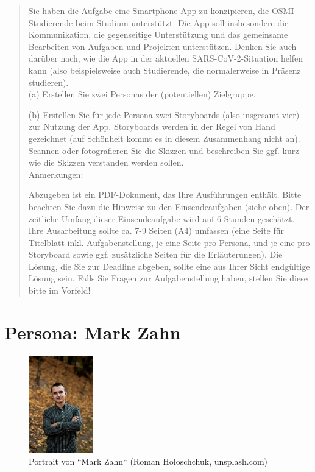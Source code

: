 \documentclass{article}
\begin{document}
\begin{quote}
	Sie haben die Aufgabe eine Smartphone-App zu konzipieren, die OSMI-Studierende beim Studium unterstützt.
	Die App soll insbesondere die Kommunikation, die gegenseitige Unterstützung und das gemeinsame Bearbeiten
	von Aufgaben und Projekten unterstützen. Denken Sie auch darüber nach, wie die App in der aktuellen
	SARS-CoV-2-Situation helfen kann (also beispielsweise auch Studierende, die normalerweise in Präsenz studieren).
	\\[1em]
	(a) Erstellen Sie zwei Personas der (potentiellen) Zielgruppe.

	(b) Erstellen Sie für jede Persona zwei Storyboards (also insgesamt vier) zur Nutzung der App. Storyboards
	werden in der Regel von Hand gezeichnet (auf Schönheit kommt es in diesem Zusammenhang nicht an). Scannen
	oder fotografieren Sie die Skizzen und beschreiben Sie ggf. kurz wie die Skizzen verstanden werden sollen.
	\\[1em]
	Anmerkungen:

	Abzugeben ist ein PDF-Dokument, das Ihre Ausführungen enthält. Bitte beachten Sie dazu die Hinweise zu den
	Einsendeaufgaben (siehe oben). Der zeitliche Umfang dieser Einsendeaufgabe wird auf 6 Stunden geschätzt.
	Ihre Ausarbeitung sollte ca. 7-9 Seiten (A4) umfassen (eine Seite für Titelblatt inkl. Aufgabenstellung,
	je eine Seite pro Persona, und je eine pro Storyboard sowie ggf. zusätzliche Seiten für die Erläuterungen).
	Die Lösung, die Sie zur Deadline abgeben, sollte eine aus Ihrer Sicht endgültige Lösung sein. Falls Sie
	Fragen zur Aufgabenstellung haben, stellen Sie diese bitte im Vorfeld!
\end{quote}

\newpage

\section{Persona: Mark Zahn}

\begin{figure}[h]
	\includegraphics[width=0.25\textwidth]{mark}
	\centering
	\caption{Portrait von ``Mark Zahn`` (Roman Holoschchuk, unsplash.com)}
\end{figure}
\end{document}
